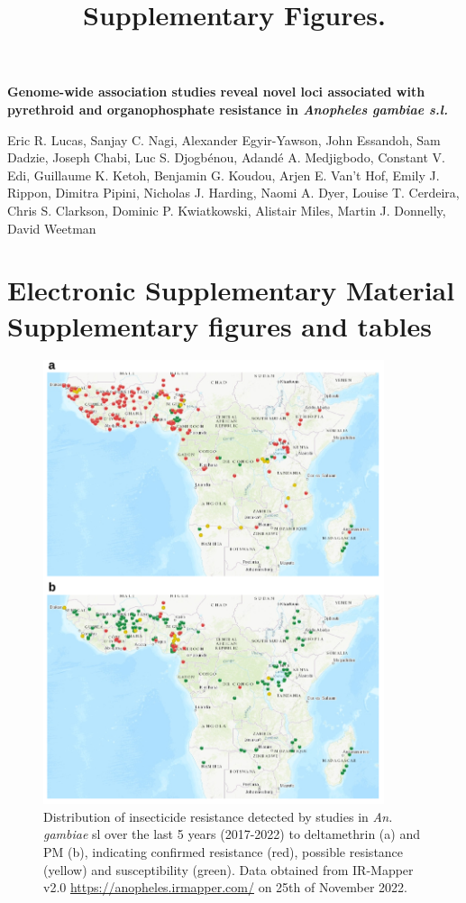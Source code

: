 \documentclass[a4paper,12pt]{article}
\title{Supplementary Figures.}
\begin{document}
\onehalfspacing

\begin{center}
	\Large
	\noindent \textbf{Genome-wide association studies reveal novel loci associated with pyrethroid and organophosphate resistance in \textit{Anopheles gambiae s.l.}}

	\normalsize

	\vskip 3cm

\end{center}

\noindent Eric R. Lucas, Sanjay C. Nagi, Alexander Egyir-Yawson, John Essandoh, Sam Dadzie, Joseph Chabi, Luc S. Djogbénou, Adandé A. Medjigbodo, Constant V. Edi, Guillaume K. Ketoh, Benjamin G. Koudou, Arjen E. Van’t Hof, Emily J. Rippon, Dimitra Pipini, Nicholas J. Harding, Naomi A. Dyer, Louise T. Cerdeira, Chris S. Clarkson, Dominic P. Kwiatkowski, Alistair Miles, Martin J. Donnelly, David Weetman 
 

 
\vskip 2cm 


\section*{Electronic Supplementary Material \\ Supplementary figures and tables}

\clearpage

\begin{figure}[h]
	\begin{center}
	\includegraphics*[width = 10cm]{./IRMapper_resistance_distribution.png}
	\caption{\footnotesize Distribution of insecticide resistance detected by studies in \textit{An. gambiae} sl over the last 5 years (2017-2022) to deltamethrin (a) and PM (b), indicating confirmed resistance (red), possible resistance (yellow) and susceptibility (green). Data obtained from IR-Mapper v2.0 \url{https://anopheles.irmapper.com/} on 25th of November 2022.}
	\end{center}
	\label{FigS1}
\end{figure}
\end{document}
